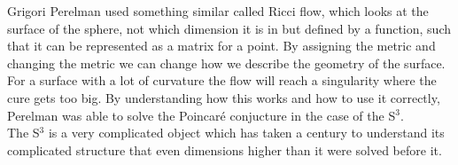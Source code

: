 \documentclass[12pt]{article} %
\begin{document}
\begin{flushleft}
Grigori Perelman used something similar called Ricci flow, which looks at the surface of the sphere, not which dimension it is in but defined by a function, such that it can be represented as a matrix for a point. By assigning the metric and changing the metric we can change how we describe the geometry of the surface. For a surface with a lot of curvature the flow will reach a singularity where the cure gets too big. By understanding how this works and how to use it correctly, Perelman was able to solve the Poincar\'e conjucture in the case of the S$^{3}$. \\

The S$^{3}$ is a very complicated object which has taken a century to understand its complicated structure that even dimensions higher than it were solved before it.\\  


\end{flushleft}
\end{document}
